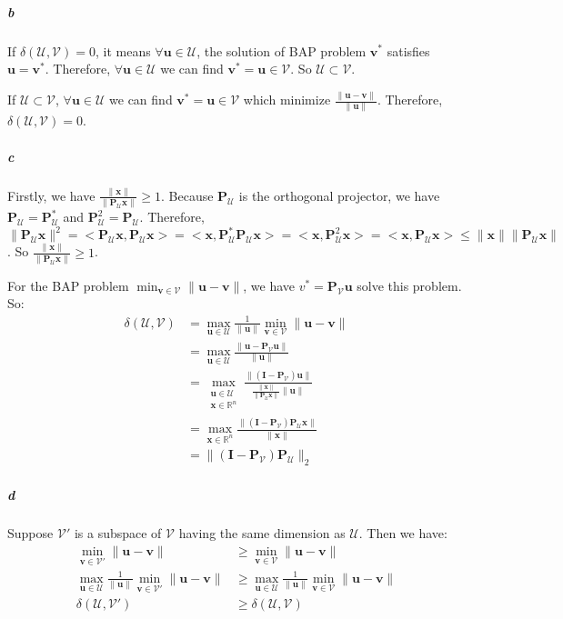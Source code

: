 \documentclass[22pt]{article}
\begin{document}
		\subparagraph{b} If $\delta(\mathcal{U,V}) =0 $, it means  $\forall\mathbf{u}\in \mathcal{U}$, the solution of BAP problem $\mathbf{v}^*$ satisfies $\mathbf{u=v}^*$. Therefore, $\forall\mathbf{u}\in \mathcal{U}$ we can find $\mathbf{v}^* = \mathbf{u} \in\mathcal{V}$. So $\mathcal{U\subset V}$.

		If $\mathcal{U\subset V}$, $\forall\mathbf{u}\in \mathcal{U}$ we can find $\mathbf{v}^* = \mathbf{u} \in\mathcal{V}$ which minimize $\frac{\|\mathbf{u-v}\|}{\|\mathbf{u}\|}$. Therefore, $\delta(\mathcal{U,V})=0$.

		\subparagraph{c}Firstly, we have $\frac{\|\mathbf{x}\|}{\|\mathbf{P}_\mathcal{U}\mathbf{x}\|}\geq 1$.  Because $\mathbf{P}_\mathcal{U}$ is the orthogonal projector, we have $\mathbf{P}_\mathcal{U}=\mathbf{P}_\mathcal{U}^*$ and $\mathbf{P}_\mathcal{U}^2 = \mathbf{P}_\mathcal{U}$. Therefore, $\|\mathbf{P}_\mathcal{U}\mathbf{x}\|^2 = <\mathbf{P}_\mathcal{U}\mathbf{x},\mathbf{P}_\mathcal{U}\mathbf{x}> = <\mathbf{x},\mathbf{P}_\mathcal{U}^*\mathbf{P}_\mathcal{U}\mathbf{x}> = <\mathbf{x}, \mathbf{P}_\mathcal{U}^2\mathbf{x}> = <\mathbf{x},\mathbf{P}_\mathcal{U}\mathbf{x}> \leq \|\mathbf{x}\|\|\mathbf{P}_\mathcal{U}\mathbf{x}\|$. So $\frac{\|\mathbf{x}\|}{\|\mathbf{P}_\mathcal{U}\mathbf{x}\|}\geq 1$.

		 For the BAP problem $\min_{\mathbf{v}\in\mathcal{V}}\|\mathbf{u-v}\|$, we have $v^* = \mathbf{P}_\mathcal{V}\mathbf{u}$ solve this problem. So:
		\begin{align}
			\delta(\mathcal{U,V}) 
			& =  \max_{\mathbf{u}\in \mathcal{U}} \frac{1}{\|\mathbf{u}\|} \min_{\mathbf{v}\in\mathcal{V}}\|\mathbf{u-v}\|\\
			& = \max_{\mathbf{u}\in \mathcal{U}} \frac{\|\mathbf{u}-\mathbf{P}_\mathcal{V}\mathbf{u}\|}{\|\mathbf{u}\|}\label{2.1} \\
			& = \max_{\substack{\mathbf{u}\in \mathcal{U}\\\mathbf{x}\in \mathbb{R}^n}} \frac{\|(\mathbf{I}-\mathbf{P}_\mathcal{V})\mathbf{u}\|}{\frac{\|\mathbf{x}\|}{\|\mathbf{P}_\mathcal{U}\mathbf{x}\|}\|\mathbf{u}\|} \label{2.2} \\
			& = \max_{\mathbf{x}\in \mathbb{R}^n} \frac{\|(\mathbf{I}-\mathbf{P}_\mathcal{V})\mathbf{P}_\mathcal{U}\mathbf{x}\|}{\|\mathbf{x}\|} \\
			& = \|(\mathbf{I}-\mathbf{P}_\mathcal{V})\mathbf{P}_\mathcal{U}\|_2
		\end{align}
			

		\subparagraph{d}
		Suppose $\mathcal{V}'$ is a subspace of $\mathcal{V}$ having the same dimension as $\mathcal{U}$. Then we have:
		\begin{align}
			\min_{\mathbf{v}\in\mathcal{V'}}\|\mathbf{u-v}\| &\geq \min_{\mathbf{v}\in\mathcal{V}}\|\mathbf{u-v}\| \\
			 \max_{\mathbf{u}\in \mathcal{U}} \frac{1}{\|\mathbf{u}\|} \min_{\mathbf{v}\in\mathcal{V'}}\|\mathbf{u-v}\| &\geq  \max_{\mathbf{u}\in \mathcal{U}} \frac{1}{\|\mathbf{u}\|} \min_{\mathbf{v}\in\mathcal{V}}\|\mathbf{u-v}\|\\
			 \delta(\mathcal{U,V'}) & \geq \delta(\mathcal{U,V})  
		\end{align}
		
\end{document}
